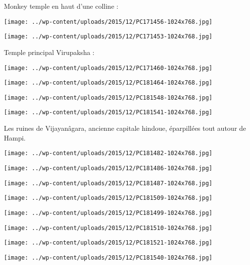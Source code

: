 Monkey temple en haut d'une colline : 
\begin{center} \texttt{[image: ../wp-content/uploads/2015/12/PC171456-1024x768.jpg]} \end{center}
\begin{center} \texttt{[image: ../wp-content/uploads/2015/12/PC171453-1024x768.jpg]} \end{center}

Temple principal Virupaksha : 
\begin{center} \texttt{[image: ../wp-content/uploads/2015/12/PC171460-1024x768.jpg]} \end{center}
\begin{center} \texttt{[image: ../wp-content/uploads/2015/12/PC181464-1024x768.jpg]} \end{center}
\begin{center} \texttt{[image: ../wp-content/uploads/2015/12/PC181548-1024x768.jpg]} \end{center}
\begin{center} \texttt{[image: ../wp-content/uploads/2015/12/PC181541-1024x768.jpg]} \end{center}

Les ruines de Vijayanâgara, ancienne capitale hindoue, éparpillées tout autour de Hampi. 
\begin{center} \texttt{[image: ../wp-content/uploads/2015/12/PC181482-1024x768.jpg]} \end{center}
\begin{center} \texttt{[image: ../wp-content/uploads/2015/12/PC181486-1024x768.jpg]} \end{center}
\begin{center} \texttt{[image: ../wp-content/uploads/2015/12/PC181487-1024x768.jpg]} \end{center}
\begin{center} \texttt{[image: ../wp-content/uploads/2015/12/PC181509-1024x768.jpg]} \end{center}
\begin{center} \texttt{[image: ../wp-content/uploads/2015/12/PC181499-1024x768.jpg]} \end{center}
\begin{center} \texttt{[image: ../wp-content/uploads/2015/12/PC181510-1024x768.jpg]} \end{center}
\begin{center} \texttt{[image: ../wp-content/uploads/2015/12/PC181521-1024x768.jpg]} \end{center}
\begin{center} \texttt{[image: ../wp-content/uploads/2015/12/PC181540-1024x768.jpg]} \end{center}

